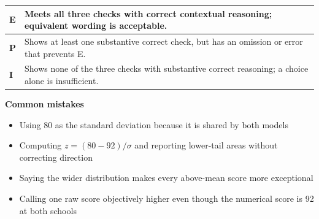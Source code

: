 \documentclass[11pt]{article}
\begin{document}
{\small\renewcommand{\arraystretch}{1.25}
\noindent\begin{tabular}{|p{0.5in}|p{5.9in}|}
\hline
\textbf{E} & Meets all three checks with correct contextual reasoning; equivalent wording is acceptable. \\ \hline
\textbf{P} & Shows at least one substantive correct check, but has an omission or error that prevents E. \\ \hline
\textbf{I} & Shows none of the three checks with substantive correct reasoning; a choice alone is insufficient. \\ \hline
\end{tabular}}

\textbf{Common mistakes}
\begin{itemize}[leftmargin=1.5em,itemsep=2pt,topsep=2pt]
  \item Using 80 as the standard deviation because it is shared by both models
  \item Computing $z=(80-92)/\sigma$ and reporting lower-tail areas without correcting direction
  \item Saying the wider distribution makes every above-mean score more exceptional
  \item Calling one raw score objectively higher even though the numerical score is 92 at both schools
\end{itemize}

\clearpage
{}
\end{document}
